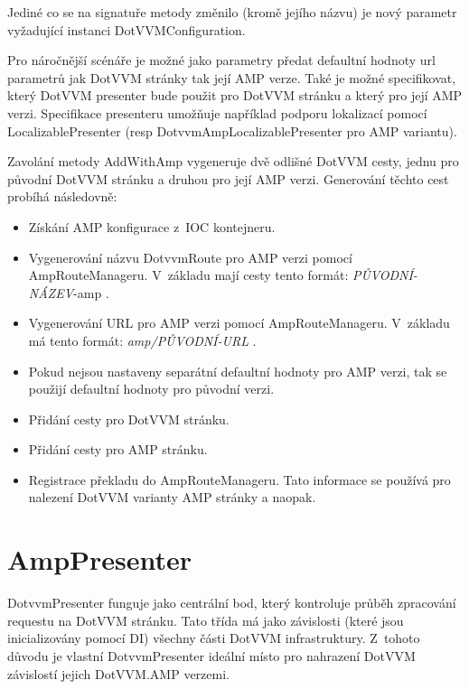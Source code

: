 Jediné co se na signatuře metody změnilo (kromě jejího názvu) je nový parametr vyžadující instanci DotVVMConfiguration.

Pro náročnější scénáře je možné jako parametry předat defaultní hodnoty url parametrů jak DotVVM stránky tak její AMP verze. Také je možné specifikovat, který DotVVM presenter bude použit pro DotVVM stránku a který pro její AMP verzi. Specifikace presenteru umožňuje například podporu lokalizací pomocí LocalizablePresenter (resp DotvvmAmpLocalizablePresenter pro AMP variantu).

Zavolání metody AddWithAmp vygeneruje dvě odlišné DotVVM cesty, jednu pro původní DotVVM stránku a druhou pro její AMP verzi.\newline
Generování těchto cest probíhá následovně:
\begin{itemize}
    \item Získání AMP konfigurace z~IOC kontejneru.
    \item Vygenerování názvu  DotvvmRoute pro AMP verzi pomocí AmpRouteManageru.\newline
    V~základu mají cesty tento formát: \textit{PŮVODNÍ-NÁZEV}-amp .
    \item Vygenerování URL  pro AMP verzi pomocí AmpRouteManageru.\newline
    V~základu má tento formát: \textit{amp/PŮVODNÍ-URL} .
    \item Pokud nejsou nastaveny separátní defaultní hodnoty pro AMP verzi, tak se použijí defaultní hodnoty pro původní verzi.
    \item Přidání cesty pro DotVVM stránku.
    \item Přidání cesty pro AMP stránku.
    \item Registrace překladu do AmpRouteManageru.\newline
    Tato informace se používá pro nalezení DotVVM varianty AMP stránky a naopak.
\end{itemize}

\section{AmpPresenter}
DotvvmPresenter funguje jako centrální bod, který kontroluje průběh zpracování requestu na DotVVM stránku. Tato třída má jako závislosti (které jsou inicializovány pomocí DI) všechny části DotVVM infrastruktury. Z~tohoto důvodu je vlastní DotvvmPresenter ideální místo pro nahrazení DotVVM závislostí jejich DotVVM.AMP verzemi.

